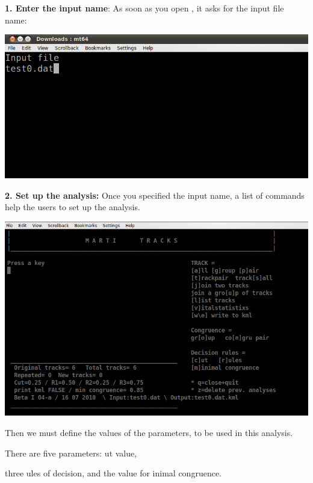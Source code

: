 \textbf{1. Enter the input name}: As soon as you open \mt, it asks for the input file name:

\begin{center}
\includegraphics[scale=0.4]{./graphics/input-file.png}
\end{center}

\textbf{2. Set up the analysis:} Once you specified the input name, a list of commands help the users to set up the analysis.

\begin{center}
 \includegraphics[scale=0.4]{./graphics/text-interface.png}
\end{center}


Then we must define the values of the parameters, to be used in this analysis. 

There are five parameters: ut value, 

three ules of decision,  and the value for inimal congruence.

